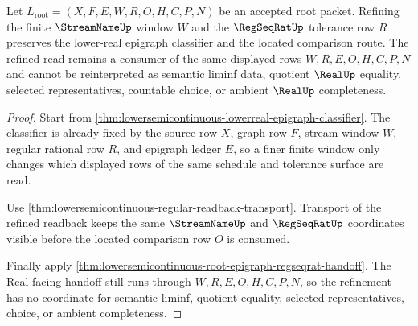 \begin{theorem}
\label{thm:lowersemicontinuous-epigraph-window-monotone-refinement}
Let $L_{\mathrm{root}}=(X,F,E,W,R,O,H,C,P,N)$ be an accepted root packet.
Refining the finite $\StreamNameUp$ window $W$ and the $\RegSeqRatUp$
tolerance row $R$ preserves the lower-real epigraph classifier and the located
comparison route. The refined read remains a consumer of the same displayed
rows $W,R,E,O,H,C,P,N$ and cannot be reinterpreted as semantic liminf data,
quotient $\RealUp$ equality, selected representatives, countable choice, or
ambient $\RealUp$ completeness.
\end{theorem}
\begin{proof}
Start from
\autoref{thm:lowersemicontinuous-lowerreal-epigraph-classifier}. The
classifier is already fixed by the source row $X$, graph row $F$, stream
window $W$, regular rational row $R$, and epigraph ledger $E$, so a finer
finite window only changes which displayed rows of the same schedule and
tolerance surface are read.

Use \autoref{thm:lowersemicontinuous-regular-readback-transport}. Transport of
the refined readback keeps the same $\StreamNameUp$ and $\RegSeqRatUp$
coordinates visible before the located comparison row $O$ is consumed.

Finally apply
\autoref{thm:lowersemicontinuous-root-epigraph-regseqrat-handoff}. The
Real-facing handoff still runs through $W,R,E,O,H,C,P,N$, so the refinement
has no coordinate for semantic liminf, quotient equality, selected
representatives, choice, or ambient completeness.
\end{proof}
